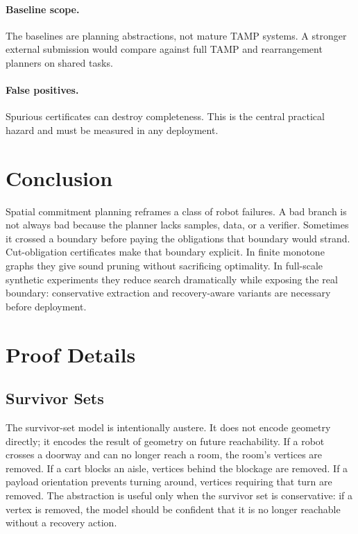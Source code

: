 \documentclass{article}
\begin{document}
\paragraph{Baseline scope.}
The baselines are planning abstractions, not mature TAMP systems. A stronger external submission would compare against full TAMP and rearrangement planners on shared tasks.

\paragraph{False positives.}
Spurious certificates can destroy completeness. This is the central practical hazard and must be measured in any deployment.

\section{Conclusion}

Spatial commitment planning reframes a class of robot failures. A bad branch is not always bad because the planner lacks samples, data, or a verifier. Sometimes it crossed a boundary before paying the obligations that boundary would strand. Cut-obligation certificates make that boundary explicit. In finite monotone graphs they give sound pruning without sacrificing optimality. In full-scale synthetic experiments they reduce search dramatically while exposing the real boundary: conservative extraction and recovery-aware variants are necessary before deployment.




\appendix
\renewcommand{\thesection}{\arabic{section}}

\section{Proof Details}

\subsection{Survivor Sets}

The survivor-set model is intentionally austere. It does not encode geometry directly; it encodes the result of geometry on future reachability. If a robot crosses a doorway and can no longer reach a room, the room's vertices are removed. If a cart blocks an aisle, vertices behind the blockage are removed. If a payload orientation prevents turning around, vertices requiring that turn are removed. The abstraction is useful only when the survivor set is conservative: if a vertex is removed, the model should be confident that it is no longer reachable without a recovery action.
\end{document}
